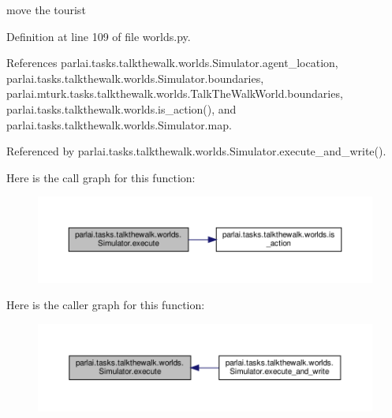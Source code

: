 \begin{DoxyVerb}move the tourist\end{DoxyVerb}
 

Definition at line 109 of file worlds.\+py.



References parlai.\+tasks.\+talkthewalk.\+worlds.\+Simulator.\+agent\+\_\+location, parlai.\+tasks.\+talkthewalk.\+worlds.\+Simulator.\+boundaries, parlai.\+mturk.\+tasks.\+talkthewalk.\+worlds.\+Talk\+The\+Walk\+World.\+boundaries, parlai.\+tasks.\+talkthewalk.\+worlds.\+is\+\_\+action(), and parlai.\+tasks.\+talkthewalk.\+worlds.\+Simulator.\+map.



Referenced by parlai.\+tasks.\+talkthewalk.\+worlds.\+Simulator.\+execute\+\_\+and\+\_\+write().

Here is the call graph for this function\+:
\nopagebreak
\begin{figure}[H]
\begin{center}
\leavevmode
\includegraphics[width=350pt]{classparlai_1_1tasks_1_1talkthewalk_1_1worlds_1_1Simulator_a4e8af8db9b10c3e5c34fdb9004d13694_cgraph}
\end{center}
\end{figure}
Here is the caller graph for this function\+:
\nopagebreak
\begin{figure}[H]
\begin{center}
\leavevmode
\includegraphics[width=350pt]{classparlai_1_1tasks_1_1talkthewalk_1_1worlds_1_1Simulator_a4e8af8db9b10c3e5c34fdb9004d13694_icgraph}
\end{center}
\end{figure}
\mbox{\label{classparlai_1_1tasks_1_1talkthewalk_1_1worlds_1_1Simulator_ae196cf0b53564026703d3ebbd4e741eb}} 
